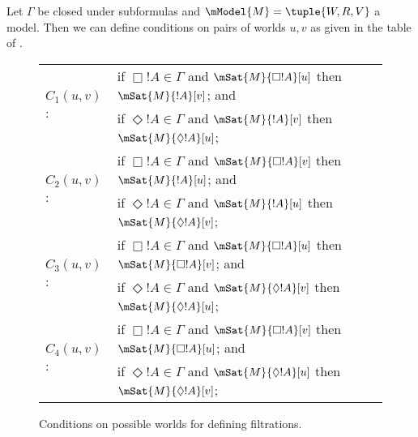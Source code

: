 \documentclass[../../../include/open-logic-section]{subfiles}
\begin{document}


\begin{defn}
  Let $\Gamma$ be closed under subformulas and $\mModel{M} =\tuple{W, R, V}$ a
  model. Then we can define conditions on pairs of worlds $u,v$ as given in
  the table of . 
\end{defn}

  \begin{figure}[ht]
    \centering
    \begin{tabular}{|ll|}
      \hline
      \multirow{2}{*}{$C_1(u,v)$:}  &if $\Box!A \in \Gamma$  and $\mSat{M}{\Box!A}[u]$ then $\mSat{M}{!A}[v]$; and \\
      & if $\Diamond!A \in \Gamma$  and $\mSat{M}{!A}[v]$ then $\mSat{M}{\Diamond!A}[u]$; \\
      \hline
      \multirow{2}{*}{$C_2(u,v)$:} &if $\Box!A \in \Gamma$  and $\mSat{M}{\Box!A}[v]$ then $\mSat{M}{!A}[u]$; and \\
      & if $\Diamond!A \in \Gamma$  and $\mSat{M}{!A}[u]$ then $\mSat{M}{\Diamond!A}[v]$; \\
      \hline
      \multirow{2}{*}{$C_3(u,v)$:} &if $\Box!A \in \Gamma$  and $\mSat{M}{\Box!A}[u]$ then $\mSat{M}{\Box!A}[v]$; and \\
      & if $\Diamond!A \in \Gamma$  and $\mSat{M}{\Diamond!A}[v]$ then $\mSat{M}{\Diamond!A}[u]$; \\
      \hline
      \multirow{2}{*}{$C_4(u,v)$:} &if $\Box!A \in \Gamma$  and $\mSat{M}{\Box!A}[v]$ then $\mSat{M}{\Box!A}[u]$; and \\
      & if $\Diamond!A \in \Gamma$  and $\mSat{M}{\Diamond!A}[u]$ then $\mSat{M}{\Diamond!A}[v]$; \\
      \hline
    \end{tabular}
    \caption{Conditions on possible worlds for defining
      filtrations.}
\end{figure}
\end{document}
